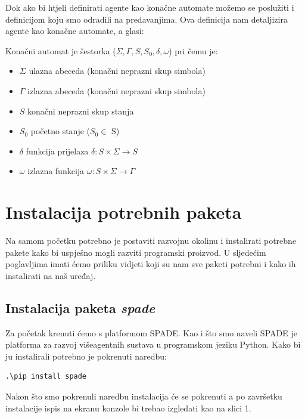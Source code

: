 \documentclass[]{foi} %
\begin{document}
Dok ako bi htjeli definirati agente kao konačne automate možemo se poslužiti i definicijom koju smo odradili na predavanjima. Ova definicija nam detaljizira agente kao konačne automate, a glasi:

Konačni automat je šestorka (\(\Sigma, \Gamma, S, S_0, \delta, \omega\)) pri čemu je:
\begin{itemize}
  \item \(\Sigma\) ulazna abeceda (konačni neprazni skup simbola)
  \item \(\Gamma\) izlazna abeceda (konačni neprazni skup simbola)
  \item \(S\) konačni neprazni skup stanja
  \item \(S_0\) početno stanje (\(S_0 \in\) S)
  \item \(\delta\) funkcija prijelaza \( \delta : S \times \Sigma \rightarrow S\)
  \item \(\omega\) izlazna funkcija \( \omega : S \times \Sigma \rightarrow \Gamma\)
\end{itemize}\cite{agentiKonacniAutomati}

\chapter{Instalacija potrebnih paketa}
Na samom početku potrebno je postaviti razvojnu okolinu i instalirati potrebne pakete kako bi uspješno mogli razviti programski proizvod. U sljedećim poglavljima imati ćemo priliku vidjeti koji su nam sve paketi potrebni i kako ih instalirati na naš uređaj.
\section{Instalacija paketa \textit{spade}}
Za početak krenuti ćemo s platformom SPADE. Kao i što smo naveli SPADE je platforma za razvoj višeagentnih sustava u programskom jeziku Python. Kako bi ju instalirali potrebno je pokrenuti naredbu: \begin{verbatim}.\pip install spade\end{verbatim} Nakon što smo pokrenuli naredbu instalacija će se pokrenuti a po završetku instalacije ispis na ekranu konzole bi trebao izgledati kao na slici 1.
\end{document}

